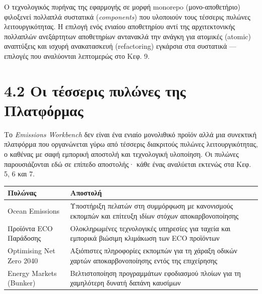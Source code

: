 \documentclass[11pt,a4paper,greek,twoside]{template-xe}
\begin{document}
Ο τεχνολογικός πυρήνας της εφαρμογής σε μορφή monorepo (μονο-αποθετήριο)
φιλοξενεί πολλαπλά συστατικά (\emph{components}) που υλοποιούν τους
τέσσερις πυλώνες λειτουργικότητας. Η επιλογή ενός ενιαίου αποθετηρίου
αντί της αρχιτεκτονικής πολλαπλών ανεξάρτητων αποθετηρίων αντανακλά την
ανάγκη για ατομικές (atomic) αναπτύξεις και ισχυρή ανακατασκευή
(refactoring) εγκάρσια στα συστατικά --- επιλογές που αναλύονται
λεπτομερώς στο Κεφ. 9.

\section{4.2 Οι τέσσερις πυλώνες της
Πλατφόρμας}\label{ux3bfux3b9-ux3c4ux3adux3c3ux3c3ux3b5ux3c1ux3b9ux3c2-ux3c0ux3c5ux3bbux3ceux3bdux3b5ux3c2-ux3c4ux3b7ux3c2-ux3c0ux3bbux3b1ux3c4ux3c6ux3ccux3c1ux3bcux3b1ux3c2}

Το \emph{Emissions Workbench} δεν είναι ένα ενιαίο μονολιθικό προϊόν
αλλά μια συνεκτική πλατφόρμα που οργανώνεται γύρω από τέσσερις
διακριτούς πυλώνες λειτουργικότητας, ο καθένας με σαφή εμπορική αποστολή
και τεχνολογική υλοποίηση. Οι πυλώνες παρουσιάζονται εδώ σε επίπεδο
αποστολής· κάθε ένας αναλύεται εκτενώς στα Κεφ. 5, 6 και 7.

\begin{longtable}[]{@{}
  >{\raggedright\arraybackslash}p{}
  >{\raggedright\arraybackslash}p{}@{}}
\toprule\noalign{}
\begin{minipage}[b]{\linewidth}\raggedright
Πυλώνας
\end{minipage} & \begin{minipage}[b]{\linewidth}\raggedright
Αποστολή
\end{minipage} \\
\midrule\noalign{}
\endhead
\bottomrule\noalign{}
\endlastfoot
Ocean Emissions & Υποστήριξη πελατών στη συμμόρφωση με κανονισμούς
εκπομπών και επίτευξη ιδίων στόχων αποκαρβονοποίησης \\
Προϊόντα ECO Παράδοσης & Ολοκληρωμένες τεχνολογικές υπηρεσίες για ταχεία
και εμπορικά βιώσιμη κλιμάκωση των ECO προϊόντων \\
Optimising Net Zero 2040 & Αξιόπιστες πληροφορίες εκπομπών για τη χάραξη
οδικών χαρτών αποκαρβονοποίησης εντός της επιχείρησης \\
Energy Markets (Bunker) & Βελτιστοποίηση προγραμμάτων εφοδιασμού πλοίων
για τη χαμηλότερη δυνατή δαπάνη καυσίμων \\
\end{longtable}
\end{document}
